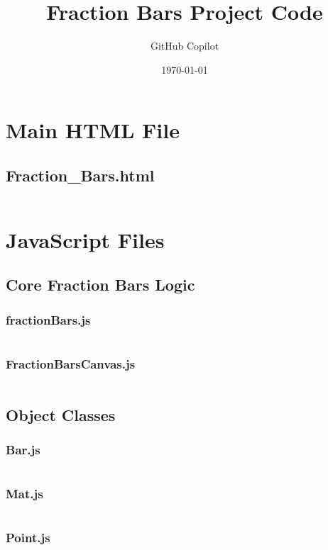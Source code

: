 \documentclass{article}
\title{Fraction Bars Project Code}
\author{GitHub Copilot}
\date{\today}
\begin{document}
\maketitle
\tableofcontents
\newpage

\section{Main HTML File}
\subsection{Fraction\_Bars.html}
\inputminted{html}{Fraction_Bars.html}

\section{JavaScript Files}
\subsection{Core Fraction Bars Logic}
\subsubsection{fractionBars.js}
\inputminted{javascript}{Fraction_Bars_files/fractionBars.js}

\subsubsection{FractionBarsCanvas.js}
\inputminted{javascript}{Fraction_Bars_files/FractionBarsCanvas.js}

\subsection{Object Classes}
\subsubsection{Bar.js}
\inputminted{javascript}{Fraction_Bars_files/Bar.js}

\subsubsection{Mat.js}
\inputminted{javascript}{Fraction_Bars_files/Mat.js}

\subsubsection{Point.js}
\inputminted{javascript}{Fraction_Bars_files/Point.js}
\end{document}
